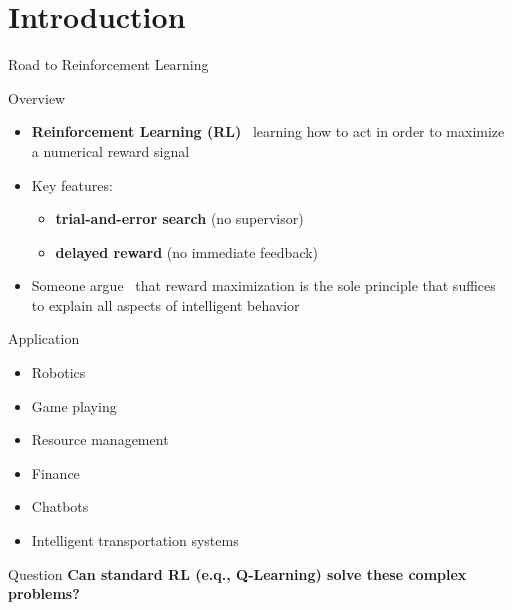 \documentclass[presentation, 9pt]{beamer}\mode<presentation>{\usetheme{AMSBolognaFC}}
\begin{document}
\section{Introduction}
\begin{frame}{Road to  Reinforcement Learning}
	\begin{block}{Overview}
		\begin{itemize}
		\item \textbf{Reinforcement Learning (RL)} \faArrowRight \, learning how to act in order to maximize a numerical reward signal
		\item Key features:
		\begin{itemize}
			\item \textbf{trial-and-error search} (no supervisor)
			\item \textbf{delayed reward} (no immediate feedback)
		\end{itemize}
		\item Someone argue~\cite{SILVER2021103535} that reward maximization is the sole principle that suffices to explain all aspects of intelligent behavior
	\end{itemize}
	\end{block}
	\begin{block}{Application}
		\begin{multicols}{2}
		\begin{itemize}
			\item Robotics
			\item Game playing
			\item Resource management
			\item Finance
			\item Chatbots
			\item Intelligent transportation systems
		\end{itemize}
		\end{multicols}
	\end{block}

	\begin{alertblock}{Question}
		\centering
		\textbf{Can standard RL (e.q., Q-Learning) solve these complex problems?}		
	\end{alertblock}
\end{frame}
\end{document}
